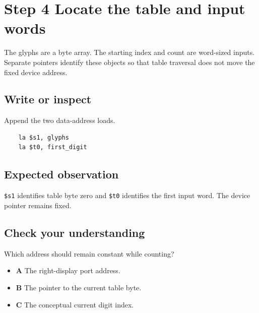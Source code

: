 \section{Step 4 Locate the table and input
  words}\label{005-seven-segment-counter-s04-step-4-locate-the-table-and-input-words}

The glyphs are a byte array. The starting index and count are word-sized
inputs. Separate pointers identify these objects so that table traversal
does not move the fixed device address.

\subsection{Write or
  inspect}\label{005-seven-segment-counter-s04-write-or-inspect}

Append the two data-address loads.

\begin{verbatim}
    la $s1, glyphs
    la $t0, first_digit
\end{verbatim}

\subsection{Expected
  observation}\label{005-seven-segment-counter-s04-expected-observation}

\texttt{\$s1} identifies table byte zero and \texttt{\$t0} identifies
the first input word. The device pointer remains fixed.

\subsection{Check your
  understanding}\label{005-seven-segment-counter-s04-check-your-understanding}

Which address should remain constant while counting?

\begin{itemize}
  \tightlist
  \item
        \textbf{A} The right-display port address.
  \item
        \textbf{B} The pointer to the current table byte.
  \item
        \textbf{C} The conceptual current digit index.
\end{itemize}
